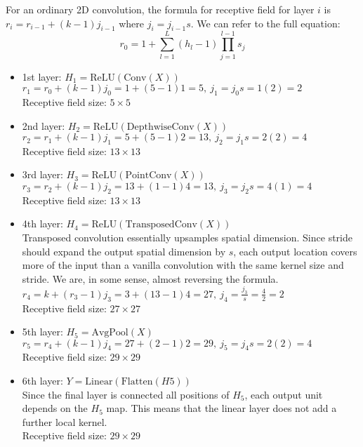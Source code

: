 \documentclass{article}
\begin{document}
{\color{blue}
For an ordinary 2D convolution, the formula for receptive field for layer $i$ is $r_i=r_{i-1}+(k-1)j_{i-1}$ where $j_i=j_{i-1}s$. We can refer to the full equation:
\begin{equation}
    r_0= 1+\sum_{l=1}^{L}(h_l-1) \prod_{j=1}^{l-1}s_j
\end{equation}
\begin{itemize}
    \item 1st layer: $H_1 = \text{ReLU}(\text{Conv}(X))$\\
    $r_1=r_0+(k-1)j_0=1+(5-1)1=5, \ j_1=j_0s=1(2)=2$\\
    Receptive field size: $5 \times 5$
    \item 2nd layer: $H_2 = \text{ReLU}(\text{DepthwiseConv}(X))$\\
    $r_2=r_1+(k-1)j_1=5+(5-1)2=13, \ j_2=j_1s=2(2)=4$\\
    Receptive field size: $13 \times 13$
    \item 3rd layer: $H_3 = \text{ReLU}(\text{PointConv}(X))$\\
    $r_3=r_2+(k-1)j_2=13+(1-1)4=13, \ j_3=j_2s=4(1)=4$\\
    Receptive field size: $13 \times 13$
    \item 4th layer: $H_4 = \text{ReLU}(\text{TransposedConv}(X))$\\
    Transposed convolution essentially upsamples spatial dimension. Since stride should expand the output spatial dimension by $s$, each output location covers more of the input than a vanilla convolution with the same kernel size and stride. We are, in some sense, almost reversing the formula. \\
    $r_4=k+(r_3-1)j_3=3+(13-1)4=27, \ j_4=\frac{j_3}{s}=\frac{4}{2}=2$\\
    Receptive field size: $27 \times 27$
    \item 5th layer: $H_5 = \text{AvgPool}(X)$\\
    $r_5=r_4+(k-1)j_4=27+(2-1)2=29, \ j_5=j_4s=2(2)=4$\\
    Receptive field size: $29 \times 29$
    \item 6th layer: $Y = \text{Linear}(\text{Flatten}(H5))$\\
    Since the final layer is connected all positions of $H_5$, each output unit depends on the $H_5$ map. This means that the linear layer does not add a further local kernel.\\
    Receptive field size: $29 \times 29$
\end{itemize}
}
\end{document}
